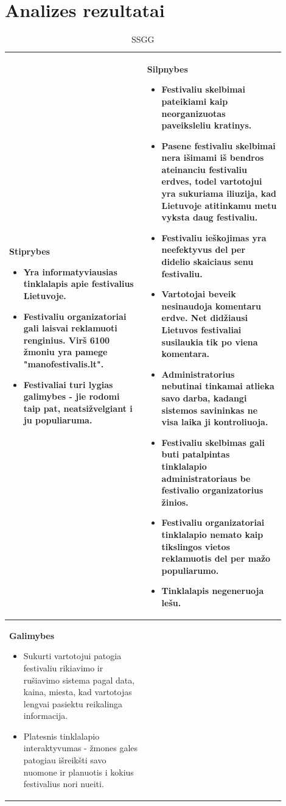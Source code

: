 ﻿\documentclass{VUMIFPSkursinis}
\begin{document}
\section{Analizes rezultatai}
\begin{longtable}{|p{0.45\linewidth}|p{0.45\linewidth}|} 
  \caption{SSGG}\\
  \hline
  \textbf{Stiprybes}
  \begin{itemize}
	\item Yra informatyviausias tinklalapis apie festivalius Lietuvoje.
	\item Festivaliu organizatoriai gali laisvai reklamuoti renginius. Virš 6100 žmoniu yra pamege "manofestivalis.lt".
	\item Festivaliai turi lygias galimybes - jie rodomi taip pat, neatsižvelgiant i ju populiaruma.
  \end{itemize}
  &
  \textbf{Silpnybes}
  \begin{itemize}
	\item Festivaliu skelbimai pateikiami kaip neorganizuotas paveiksleliu kratinys.
	\item Pasene festivaliu skelbimai nera išimami iš bendros ateinanciu festivaliu erdves, todel vartotojui yra sukuriama iliuzija, kad Lietuvoje atitinkamu metu vyksta daug festivaliu.
	\item Festivaliu ieškojimas yra neefektyvus del per didelio skaiciaus senu festivaliu.
	\item Vartotojai beveik nesinaudoja komentaru erdve. Net didžiausi Lietuvos festivaliai susilaukia tik po viena komentara.
	\item Administratorius nebutinai tinkamai atlieka savo darba, kadangi sistemos savininkas ne visa laika ji kontroliuoja.
	\item Festivaliu skelbimas gali buti patalpintas tinklalapio administratoriaus be festivalio organizatorius žinios.
	\item Festivaliu organizatoriai tinklalapio nemato kaip tikslingos vietos reklamuotis del per mažo populiarumo.
	\item Tinklalapis negeneruoja lešu.
  \end{itemize}\\
  \hline
  \textbf{Galimybes}
  \begin{itemize}
	\item Sukurti vartotojui patogia festivaliu rikiavimo ir rušiavimo sistema pagal data, kaina, miesta, kad vartotojas lengvai pasiektu reikalinga informacija.
	\item Platesnis tinklalapio interaktyvumas - žmones gales patogiau išreikšti savo nuomone ir planuotis i kokius festivalius nori nueiti.

\end{itemize}
\end{longtable}
\end{document}
